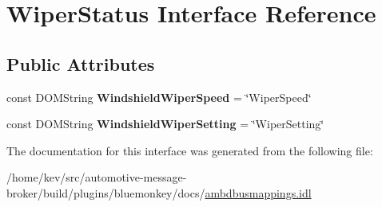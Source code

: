 \hypertarget{interfaceWiperStatus}{\section{Wiper\+Status Interface Reference}
\label{interfaceWiperStatus}
}
\subsection*{Public Attributes}
\begin{DoxyCompactItemize}
\item 
\hypertarget{interfaceWiperStatus_a2450e48040a1ab0eacf41a069026801b}{const D\+O\+M\+String {\bfseries Windshield\+Wiper\+Speed} = \char`\"{}Wiper\+Speed\char`\"{}}\label{interfaceWiperStatus_a2450e48040a1ab0eacf41a069026801b}

\item 
\hypertarget{interfaceWiperStatus_a85849714f517ea47be7dded2874e4ed0}{const D\+O\+M\+String {\bfseries Windshield\+Wiper\+Setting} = \char`\"{}Wiper\+Setting\char`\"{}}\label{interfaceWiperStatus_a85849714f517ea47be7dded2874e4ed0}

\end{DoxyCompactItemize}


The documentation for this interface was generated from the following file\+:\begin{DoxyCompactItemize}
\item 
/home/kev/src/automotive-\/message-\/broker/build/plugins/bluemonkey/docs/\hyperlink{ambdbusmappings_8idl}{ambdbusmappings.\+idl}\end{DoxyCompactItemize}

